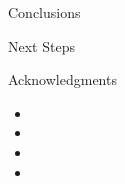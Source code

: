 \begin{frame}[t]{Conclusions}
    
    
    
\end{frame}


\begin{frame}[t]{Next Steps}
    
    
    
\end{frame}


\begin{frame}[t]{Acknowledgments}
    \footnotesize
    \begin{itemize}
      \item 
      \item 
      \item 
      \item 
    \end{itemize}
    
\end{frame}